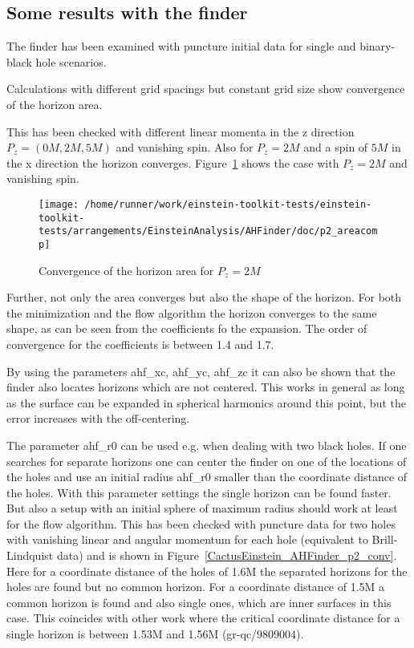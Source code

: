 \subsection{Some results with the finder}
The finder has been examined with puncture initial data for single and
binary-black hole scenarios.

Calculations with different grid spacings but constant grid size show
convergence of the horizon area.

This has been checked with different linear momenta in the z direction
$P_{z}=(0M,2M,5M)$ and vanishing spin. Also for $P_{z}=2M$ and a spin of $5M$
in the x direction the horizon converges. 
Figure~\ref{CactusEistein_AHFinder_p2_conv} shows the case with
$P_{z}=2M$ and vanishing spin.

\begin{figure}[ht]
\begin{center}
\texttt{[image: /home/runner/work/einstein-toolkit-tests/einstein-toolkit-tests/arrangements/EinsteinAnalysis/AHFinder/doc/p2\_areacomp]}
\end{center}
\caption{Convergence of the horizon area for $P_{z}=2M$}
\label{CactusEistein_AHFinder_p2_conv}
\end{figure}

Further, not only the area converges but also the shape of the horizon.
For both the minimization and the flow algorithm the horizon converges to
the same shape, as can be seen from the coefficients fo the expansion.
The order of convergence for the coefficients is between 1.4 and 1.7.

By using the parameters ahf\_xc, ahf\_yc, ahf\_zc it can also be shown that
the finder also locates horizons which are not centered. This works in
general as long as the surface can be expanded in spherical harmonics
around this point, but the error increases with the off-centering.

The parameter ahf\_r0 can be used e.g. when dealing with two black holes.
If one searches for separate horizons one can center the finder on one of
the locations of the holes and use an initial radius ahf\_r0 smaller than
the coordinate distance of the holes. With this parameter settings the
single horizon can be found faster. But also a setup with an initial
sphere of maximum radius should work at least for the flow algorithm.
This has been checked with puncture data for two holes with vanishing
linear and angular momentum for each hole (equivalent to Brill-Lindquist
data) and is shown in Figure~\ref{CactusEinstein_AHFinder_p2_conv}. 
Here for a coordinate distance of the holes of 1.6M the separated
horizons for the holes are found but no common horizon. For a coordinate
distance of 1.5M a common horizon is found and also single ones, which
are inner surfaces in this case. This coincides with other work where the
critical coordinate distance for a single horizon is between 1.53M and
1.56M (gr-qc/9809004).

